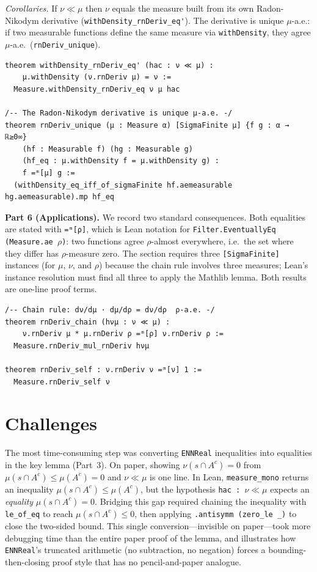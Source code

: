 \documentclass[11pt]{article}
\begin{document}
\smallskip
\noindent
\emph{Corollaries.}
If $\nu \ll \mu$ then $\nu$ equals the measure built from its own Radon-Nikodym derivative (\verb|withDensity_rnDeriv_eq'|). The derivative is unique $\mu$-a.e.: if two measurable functions define the same measure via \texttt{withDensity}, they agree $\mu$-a.e.\ (\verb|rnDeriv_unique|).

\begin{verbatim}
theorem withDensity_rnDeriv_eq' (hac : ν ≪ μ) :
    μ.withDensity (ν.rnDeriv μ) = ν :=
  Measure.withDensity_rnDeriv_eq ν μ hac

/-- The Radon-Nikodym derivative is unique μ-a.e. -/
theorem rnDeriv_unique (μ : Measure α) [SigmaFinite μ] {f g : α → ℝ≥0∞}
    (hf : Measurable f) (hg : Measurable g)
    (hf_eq : μ.withDensity f = μ.withDensity g) :
    f =ᵐ[μ] g :=
  (withDensity_eq_iff_of_sigmaFinite hf.aemeasurable hg.aemeasurable).mp hf_eq
\end{verbatim}

\medskip
\noindent
\textbf{Part 6 (Applications).}
We record two standard consequences. Both equalities are stated with \texttt{=ᵐ[ρ]}, which is Lean notation for \texttt{Filter.EventuallyEq (Measure.ae $\rho$)}: two functions agree $\rho$-almost everywhere, i.e.\ the set where they differ has $\rho$-measure zero. The section requires three \texttt{[SigmaFinite]} instances (for $\mu$, $\nu$, and $\rho$) because the chain rule involves three measures; Lean's instance resolution must find all three to apply the Mathlib lemma. Both results are one-line proof terms.

\begin{verbatim}
/-- Chain rule: dν/dμ · dμ/dρ = dν/dρ  ρ-a.e. -/
theorem rnDeriv_chain (hνμ : ν ≪ μ) :
    ν.rnDeriv μ * μ.rnDeriv ρ =ᵐ[ρ] ν.rnDeriv ρ :=
  Measure.rnDeriv_mul_rnDeriv hνμ

theorem rnDeriv_self : ν.rnDeriv ν =ᵐ[ν] 1 :=
  Measure.rnDeriv_self ν
\end{verbatim}

\section{Challenges}

The most time-consuming step was converting \texttt{ENNReal} inequalities into equalities in the key lemma (Part~3). On paper, showing $\nu(s \cap A^c) = 0$ from $\mu(s \cap A^c) \le \mu(A^c) = 0$ and $\nu \ll \mu$ is one line. In Lean, \texttt{measure\_mono} returns an inequality $\mu(s \cap A^c) \le \mu(A^c)$, but the hypothesis \texttt{hac~:~$\nu \ll \mu$} expects an \emph{equality} $\mu(s \cap A^c) = 0$. Bridging this gap required chaining the inequality with \texttt{le\_of\_eq} to reach $\mu(s \cap A^c) \le 0$, then applying \texttt{.antisymm~(zero\_le~\_)} to close the two-sided bound. This single conversion---invisible on paper---took more debugging time than the entire paper proof of the lemma, and illustrates how \texttt{ENNReal}'s truncated arithmetic (no subtraction, no negation) forces a bounding-then-closing proof style that has no pencil-and-paper analogue.
\end{document}
